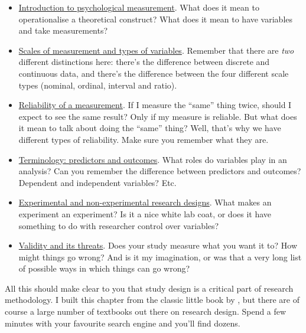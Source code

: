 \documentclass[]{book}
\providecommand{\tightlist}{%
  \setlength{\itemsep}{0pt}\setlength{\parskip}{0pt}}
\begin{document}
\begin{itemize}
\tightlist
\item
  \protect\hyperlink{measurement}{Introduction to psychological measurement}. What does it mean to operationalise a theoretical construct? What does it mean to have variables and take measurements?
\item
  \protect\hyperlink{scales}{Scales of measurement and types of variables}. Remember that there are \emph{two} different distinctions here: there's the difference between discrete and continuous data, and there's the difference between the four different scale types (nominal, ordinal, interval and ratio).
\item
  \protect\hyperlink{reliability}{Reliability of a measurement}. If I measure the ``same'' thing twice, should I expect to see the same result? Only if my measure is reliable. But what does it mean to talk about doing the ``same'' thing? Well, that's why we have different types of reliability. Make sure you remember what they are.
\item
  \protect\hyperlink{ivdv}{Terminology: predictors and outcomes}. What roles do variables play in an analysis? Can you remember the difference between predictors and outcomes? Dependent and independent variables? Etc.
\item
  \protect\hyperlink{researchdesigns}{Experimental and non-experimental research designs}. What makes an experiment an experiment? Is it a nice white lab coat, or does it have something to do with researcher control over variables?
\item
  \protect\hyperlink{validity}{Validity and its threats}. Does your study measure what you want it to? How might things go wrong? And is it my imagination, or was that a very long list of possible ways in which things can go wrong?
\end{itemize}

All this should make clear to you that study design is a critical part of research methodology. I built this chapter from the classic little book by \citet{Campbell1963}, but there are of course a large number of textbooks out there on research design. Spend a few minutes with your favourite search engine and you'll find dozens.


\end{document}
